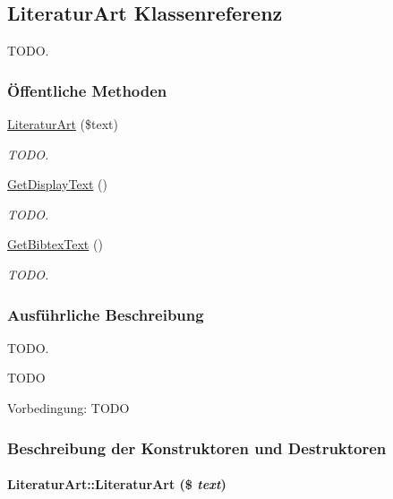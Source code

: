 \hypertarget{classLiteraturArt}{
\subsection{Literatur\-Art Klassenreferenz}
\label{classLiteraturArt}
}
TODO.  


\subsubsection*{\"{O}ffentliche Methoden}
\begin{CompactItemize}
\item 
\hyperlink{classLiteraturArt_b3312217430531ed7821a46a39c49af7}{Literatur\-Art} (\$text)
\begin{CompactList}\small\item\em TODO. \item\end{CompactList}\item 
\hyperlink{classLiteraturArt_43f747a6c5d840a22ddcd7e46d27cba0}{Get\-Display\-Text} ()
\begin{CompactList}\small\item\em TODO. \item\end{CompactList}\item 
\hyperlink{classLiteraturArt_01e1a2acd95df1ae0bb22e57b70a63de}{Get\-Bibtex\-Text} ()
\begin{CompactList}\small\item\em TODO. \item\end{CompactList}\end{CompactItemize}


\subsubsection{Ausf\"{u}hrliche Beschreibung}
TODO. 

TODO \begin{Desc}
\item[Vorbedingung:]TODO \end{Desc}




\subsubsection{Beschreibung der Konstruktoren und Destruktoren}
\hypertarget{classLiteraturArt_b3312217430531ed7821a46a39c49af7}{
\paragraph[LiteraturArt]{\setlength{\rightskip}{0pt plus 5cm}Literatur\-Art::Literatur\-Art (\$ {\em text})}\hfill}
\label{classLiteraturArt_b3312217430531ed7821a46a39c49af7}


